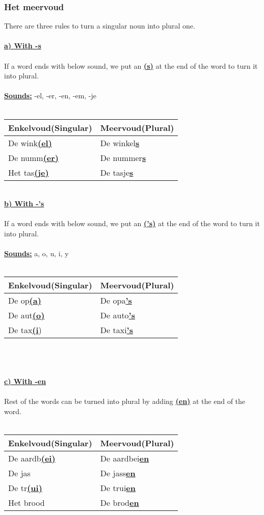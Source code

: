 \documentclass[a4paper,14pt]{extarticle}
\newcommand{\emp}[1]{\underline{\textbf{#1}}}
\begin{document}
\subsubsection{Het meervoud}
There are three rules to turn a singular noun into plural one.\\ \\
\emp{a) With -s} \\ \\
If a word ends with below sound, we put an \emp{(s)} at the end of the word to turn it into plural. \\ \\
\emp{Sounds:} -el, -er, -en, -em, -je \\ \\
\begin{tabularx}{\textwidth}{ p{} p{} }
 \hline
 Enkelvoud(Singular) & Meervoud(Plural)\\
 \hline
 De wink\emp{(el)} & De winkel\emp{s} \\
 De numm\emp{(er)} & De nummer\emp{s} \\
 Het tas\emp{(je)} & De tasje\emp{s}
\end{tabularx}
\newpage
\hfill \\
\emp{b) With -'s} \\ \\
If a word ends with below sound, we put an \emp{('s)} at the end of the word to turn it into plural. \\ \\
\emp{Sounds:} a, o, u, i, y \\ \\
\begin{tabularx}{\textwidth}{ p{} p{} }
 \hline
 Enkelvoud(Singular) & Meervoud(Plural)\\
 \hline
 De op\emp{(a)} & De opa\emp{'s} \\
 De aut\emp{(o)} & De auto\emp{'s} \\
 De tax\emp{(i}) & De taxi\emp{'s}
\end{tabularx} \\ \\ \\
\emp{c) With -en} \\ \\
Rest of the words can be turned into plural by adding \emp{(en)} at the end of the word. \\ \\
\begin{tabularx}{\textwidth}{ p{} p{} }
 \hline
 Enkelvoud(Singular) & Meervoud(Plural)\\
 \hline
 De aardb\emp{(ei)} & De aardbei\emp{en} \\
 De jas & De jass\emp{en} \\
 De tr\emp{(ui)} & De trui\emp{en} \\
 Het brood & De brod\emp{en}
\end{tabularx} \\ \\ \\
\end{document}
